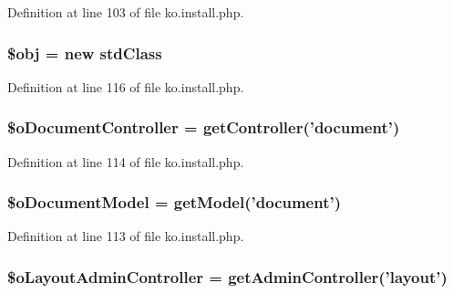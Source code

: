 Definition at line 103 of file ko.\+install.\+php.

\hypertarget{ko_8install_8php_a9008ed94ba185855b1723e367744b87e}{
\subsubsection[{\$obj}]{\setlength{\rightskip}{0pt plus 5cm}\$obj = new std\+Class}}\label{ko_8install_8php_a9008ed94ba185855b1723e367744b87e}


Definition at line 116 of file ko.\+install.\+php.

\hypertarget{ko_8install_8php_aac43fce682d4b7a05df6d3e44c2c54e6}{
\subsubsection[{\$o\+Document\+Controller}]{\setlength{\rightskip}{0pt plus 5cm}\$o\+Document\+Controller = {\bf get\+Controller}('{\bf document}')}}\label{ko_8install_8php_aac43fce682d4b7a05df6d3e44c2c54e6}


Definition at line 114 of file ko.\+install.\+php.

\hypertarget{ko_8install_8php_afb18aa87e5520385e76377e876e042af}{
\subsubsection[{\$o\+Document\+Model}]{\setlength{\rightskip}{0pt plus 5cm}\$o\+Document\+Model = {\bf get\+Model}('{\bf document}')}}\label{ko_8install_8php_afb18aa87e5520385e76377e876e042af}


Definition at line 113 of file ko.\+install.\+php.

\hypertarget{ko_8install_8php_a6a03496003da7df71cf94d9accb430be}{
\subsubsection[{\$o\+Layout\+Admin\+Controller}]{\setlength{\rightskip}{0pt plus 5cm}\$o\+Layout\+Admin\+Controller = {\bf get\+Admin\+Controller}('{\bf layout}')}}\label{ko_8install_8php_a6a03496003da7df71cf94d9accb430be}


